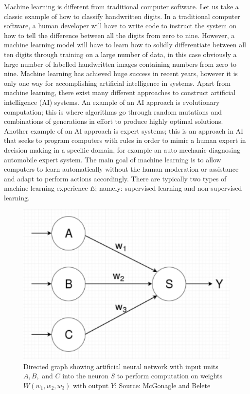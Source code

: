 \documentclass[master]{thesis-uestc}
\begin{document}
Machine learning is different from traditional computer software. Let us take a classic example of how to classify handwritten digits. In a traditional computer software, a human developer will have to write code to instruct the system on how to tell the difference between all the digits from zero to nine. However, a machine learning model will have to learn how to solidly differentiate between all ten digits through training on a large number of data, in this case obviously a large number of labelled handwritten images containing numbers from zero to nine. Machine learning has achieved huge success in recent years, however it is only one way for accomplishing artificial intelligence in systems. Apart from machine learning, there exist many different approaches to construct artificial intelligence (AI) systems. An example of an AI approach is evolutionary computation; this is where algorithms go through random mutations and combinations of generations in effort to produce highly optimal solutions. Another example of an AI approach is expert systems; this is an approach in AI that seeks to program computers with rules in order to mimic a human expert in decision making in a specific domain, for example an auto mechanic diagnosing automobile expert system. The main goal of machine learning is to allow computers to learn automatically without the human moderation or assistance and adapt to perform actions accordingly. There are typically two types of machine learning experience $E$; namely: supervised learning and non-supervised learning.

\begin{figure}[ht]
\includegraphics[width=5in]{pic/neuron.png}
\caption{Directed graph showing artificial neural network with input units $A, B,$ and $C$ into the neuron $S$ to perform computation on weights $W (w_1, w_2, w_3)$ with output $Y$: Source: McGonagle and Belete}
\label{fig_neuron}
\end{figure}
\end{document}
